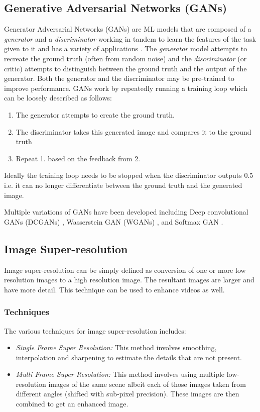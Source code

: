 \documentclass[conference]{IEEEtran}
\begin{document}
		\subsection{Generative Adversarial Networks (GANs)}
			Generator Adversarial Networks (GANs) are ML models that are composed of a \emph{generator} and a \emph{discriminator} working in tandem to learn the features of the task given to it and has a variety of applications \cite{b2}. The \emph{generator} model attempts to recreate the ground truth (often from random noise) and the \emph{discriminator} (or critic) attempts to distinguish between the ground truth and the output of the generator. Both the generator and the discriminator may be pre-trained to improve performance. GANs work by repeatedly running a training loop which can be loosely described as follows:
			\begin{enumerate}
				\item The generator attempts to create the ground truth.
				\item The discriminator takes this generated image and compares it to the ground truth
				\item Repeat 1. based on the feedback from 2.
			\end{enumerate}
			Ideally the training loop needs to be stopped when the discriminator outputs $0.5$ i.e. it can no longer differentiate between the ground truth and the generated image.
			\par Multiple variations of GANs have been developed including Deep convolutional GANs (DCGANs) \cite{b3}, Wasserstein GAN (WGANs) \cite{b4}, and Softmax GAN \cite{b5}.
			
		\subsection{Image Super-resolution}
			Image super-resolution \cite{b6} can be simply defined as conversion of one or more low resolution images to a high resolution image. The resultant images are larger and have more detail. This technique can be used to enhance videos as well.
			
			\subsubsection{Techniques}
				The various techniques for image super-resolution includes:
				\begin{itemize}
					\item \textit{Single Frame Super Resolution:} This method involves smoothing, interpolation and sharpening to estimate the details that are not present.
					\item \textit{Multi Frame Super Resolution:} This method involves using multiple low-resolution images of the same scene albeit each of those images taken from different angles (shifted with sub-pixel precision). These images are then combined to get an enhanced image.
				\end{itemize}
			
\end{document}
